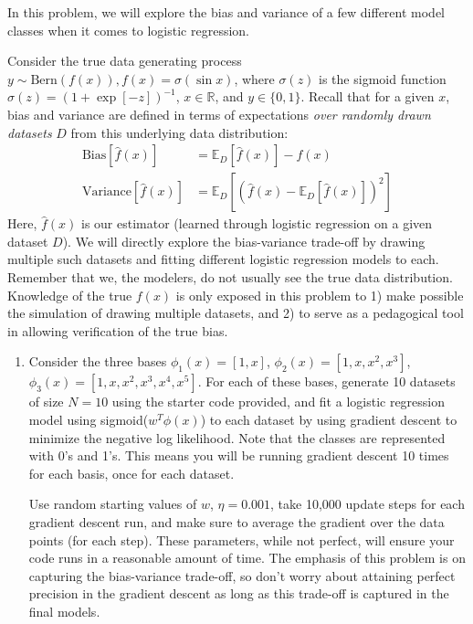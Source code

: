 \documentclass[submit]{harvardml}
\begin{document}
\begin{problem}
  In this problem, we will explore the bias and variance of a
  few different model classes when it comes to logistic regression.

  Consider the true data generating process $y \sim \text{Bern}(f(x)), f(x) = \sigma(\sin x)$, where $\sigma(z)$ is the sigmoid function
  $\sigma(z)= (1+\exp[-z])^{-1}$, $x \in \mathbb{R}$, and $y \in \{0,1\}$.
  Recall that for a given $x$, bias and variance are defined in terms of expectations \textit{over randomly drawn datasets} $D$
  from this underlying data distribution:
  \begin{align*}
  \text{Bias}[\hat{f}(x)] &= \mathbb{E}_D[\hat{f}(x)] - f(x)\\
  \text{Variance}[\hat{f}(x)] &= \mathbb{E}_D[(\hat{f}(x) - \mathbb{E}_D[\hat{f}(x)])^2]
  \end{align*}
  Here, $\hat{f}(x)$ is our estimator (learned through logistic regression on a given dataset $D$).
  We will directly explore the bias-variance trade-off by drawing multiple such datasets and fitting different logistic regression models to each.
  Remember that we, the modelers, do not usually see the true data distribution.
  Knowledge of the true $f(x)$ is only exposed in this problem to 1) make possible the simulation
  of drawing multiple datasets, and 2) to serve as a pedagogical tool in allowing
  verification of the true bias.

\begin{enumerate}

\item Consider the three bases $\phi_1(x) = [1, x]$,
  $\phi_2(x) = [1, x, x^2, x^3]$, $\phi_3(x) = [1, x, x^2, x^3, x^4, x^5]$.
  For each of these bases, generate 10 datasets of size $N = 10$ using the starter code provided, and fit a logistic regression model using sigmoid($w^T \phi(x)$) to each dataset by using
  gradient descent to minimize the negative log likelihood. Note that the classes are represented with 0's and 1's.
  This means you will be running gradient descent 10 times for each basis, once for each dataset.

  Use random starting values of $w$, $\eta=0.001$, take 10,000 update steps
   for each gradient descent run, and make sure to average the gradient over the data points
   (for each step). These parameters, while not perfect, will ensure your code
   runs in a reasonable amount of time. The emphasis of this problem is on
   capturing the bias-variance trade-off, so don't worry about attaining perfect precision in the gradient descent
   as long as this trade-off is captured in the final models.


\end{enumerate}
\end{problem}
\end{document}
